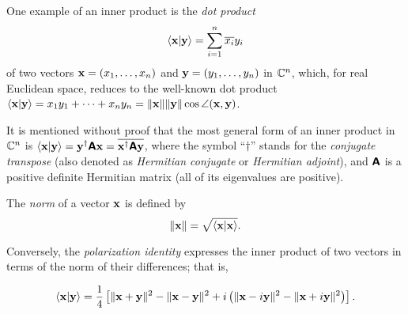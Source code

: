 {
\color{blue}
\bexample
One example of an inner product is  the
{\em dot product}
\begin{equation}
\langle {{\bf x}} \vert  {\bf y} \rangle
=
\sum_{i=1}^n \overline{x_i}y_i
\end{equation}
of two vectors ${\bf x}=
(x_1,\ldots , x_n)$
and
${\bf y}=
(y_1,\ldots , y_n)$ in ${\Bbb C}^n$,
which, for real Euclidean space,  reduces to the well-known dot product
$\langle  {\bf x} \vert {\bf y} \rangle
=
{x_1}y_1 + \cdots + {x_n}y_n  = \| {\bf x}\| \| {\bf y}\| \cos \angle ({\bf x},{\bf y})$.


It is mentioned without proof that the most general form of an inner product in ${\Bbb C}^n$
is
$\langle  {\bf x} \vert {\bf y} \rangle
=  {\bf y}^\dagger \textsf{\textbf{A}} {\bf x}= \overline{ {\bf x}^\dagger \textsf{\textbf{A}} {\bf y}}$,
where the symbol ``$\dagger$'' stands for the {\em conjugate transpose} (also denoted as
{\em Hermitian conjugate} or {\em Hermitian adjoint}),
and $ \textsf{\textbf{A}} $ is a positive definite Hermitian matrix (all of its eigenvalues are positive).
\eexample
}



The {\em norm} of a vector ${\bf x}$
is defined by
\begin{equation}
\|
{\bf x}
\|
=\sqrt{\langle {\bf x}\vert {\bf x}\rangle }
.
\label{2018-mm-ch-vn}
\end{equation}

Conversely, the {\em polarization identity}
expresses the inner product of two vectors in terms of the norm of their differences; that is,

\begin{equation}
\langle {\bf x}\vert {\bf y}\rangle
=
\frac{1}{4}\left[
\|  {\bf x}+ {\bf y} \|^2
-
\|  {\bf x}- {\bf y} \|^2
+ i
\left(
 \|  {\bf x}- i{\bf y} \|^2
-
\|  {\bf x}+ i{\bf y} \|^2
\right)
\right]
.
\label{2015-m-ch-polidc}
\end{equation}


